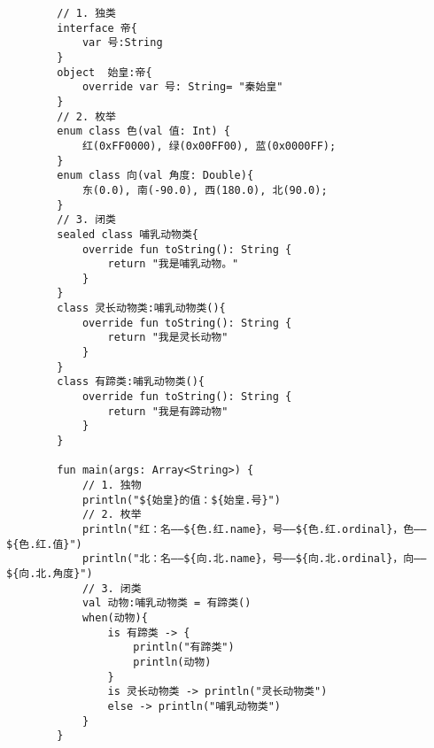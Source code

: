     \begin{verbatim}
        // 1. 独类
        interface 帝{
            var 号:String
        }
        object  始皇:帝{
            override var 号: String= "秦始皇"
        }
        // 2. 枚举
        enum class 色(val 值: Int) {
            红(0xFF0000), 绿(0x00FF00), 蓝(0x0000FF);
        }
        enum class 向(val 角度: Double){
            东(0.0), 南(-90.0), 西(180.0), 北(90.0);
        }
        // 3. 闭类
        sealed class 哺乳动物类{
            override fun toString(): String {
                return "我是哺乳动物。"
            }
        }
        class 灵长动物类:哺乳动物类(){
            override fun toString(): String {
                return "我是灵长动物"
            }
        }
        class 有蹄类:哺乳动物类(){
            override fun toString(): String {
                return "我是有蹄动物"
            }
        }
        
        fun main(args: Array<String>) {
            // 1. 独物
            println("${始皇}的值：${始皇.号}")
            // 2. 枚举
            println("红：名——${色.红.name}，号——${色.红.ordinal}，色——${色.红.值}")
            println("北：名——${向.北.name}，号——${向.北.ordinal}，向——${向.北.角度}")
            // 3. 闭类
            val 动物:哺乳动物类 = 有蹄类()
            when(动物){
                is 有蹄类 -> {
                    println("有蹄类")
                    println(动物)
                }
                is 灵长动物类 -> println("灵长动物类")
                else -> println("哺乳动物类")
            }
        }               
    \end{verbatim}
